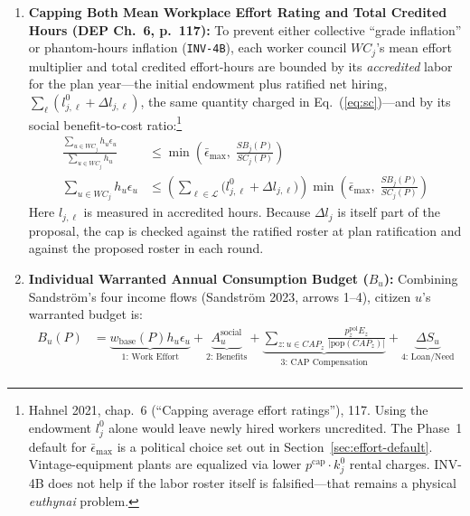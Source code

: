 \documentclass[10pt,twoside,openany]{book}
\theoremstyle{dpepstyle}
\begin{document}
\begin{enumerate}[leftmargin=1.8em,itemsep=3pt]
  \begin{align}
    Y^{\text{work}}(P) &= (1 - \sigma_{\text{inv}}) Y^{\text{GDP}}(P) - Y^{\text{allow}} - Y^{\text{CAP}}(P) - \Delta S^{\text{agg}} \nonumber \\
    w_{\text{base}}(P) &= \frac{Y^{\text{work}}(P)}{\sum_{u \in \mathcal{I}^{\text{work}}} h_u \epsilon_u} \quad\text{(then rescale all prices so } w_{\text{base}}=1\text{)}
  \end{align}
  \item \textbf{Capping Both Mean Workplace Effort Rating and Total Credited Hours (DEP Ch.~6, p.~117):}
  To prevent either collective ``grade inflation'' or phantom-hours inflation (\texttt{INV-4B}), each worker council $WC_j$'s mean effort multiplier and total credited effort-hours are bounded by its \emph{accredited} labor for the plan year---the initial endowment plus ratified net hiring, $\sum_\ell (l^0_{j,\ell} + \Delta l_{j,\ell})$, the same quantity charged in Eq.~(\ref{eq:sc})---and by its social benefit-to-cost ratio:\footnote{Hahnel 2021, chap.~6 (``Capping average effort ratings''), 117. Using the endowment $l^0_j$ alone would leave newly hired workers uncredited. The Phase~1 default for $\bar{\epsilon}_{\max}$ is a political choice set out in Section~\ref{sec:effort-default}. Vintage-equipment plants are equalized via lower $p^{\text{cap}} \cdot k_j^0$ rental charges. INV-4B does not help if the labor roster itself is falsified---that remains a physical \emph{euthynai} problem.}
  \begin{align}
    \frac{\sum_{u \in WC_j} h_u \epsilon_u}{\sum_{u \in WC_j} h_u} &\le \min\left(\bar{\epsilon}_{\max}, \; \frac{SB_j(P)}{SC_j(P)}\right) \nonumber \\
    \sum_{u \in WC_j} h_u \epsilon_u &\le \left(\sum_{\ell \in \mathcal{L}} \big(l^0_{j,\ell} + \Delta l_{j,\ell}\big)\right) \min\left(\bar{\epsilon}_{\max}, \; \frac{SB_j(P)}{SC_j(P)}\right) \label{eq:effort-cap}
  \end{align}
  Here $l_{j,\ell}$ is measured in accredited hours. Because $\Delta l_j$ is itself part of the proposal, the cap is checked against the ratified roster at plan ratification and against the proposed roster in each round.
  \item \textbf{Individual Warranted Annual Consumption Budget ($B_u$):}
  Combining Sandstr\"om's four income flows (Sandstr\"om 2023, arrows 1--4), citizen $u$'s warranted budget is:
  \begin{align}
    B_u(P) &= \underbrace{w_{\text{base}}(P) h_u \epsilon_u}_{\text{1: Work Effort}} + \underbrace{A_u^{\text{social}}}_{\text{2: Benefits}} + \underbrace{\sum_{z: u \in CAP_z} \frac{p_z^{\text{pol}} E_z}{|\text{pop}(CAP_z)|}}_{\text{3: CAP Compensation}} + \underbrace{\Delta S_u}_{\text{4: Loan/Need}} \nonumber \\

\end{align}
\end{enumerate}
\end{document}
